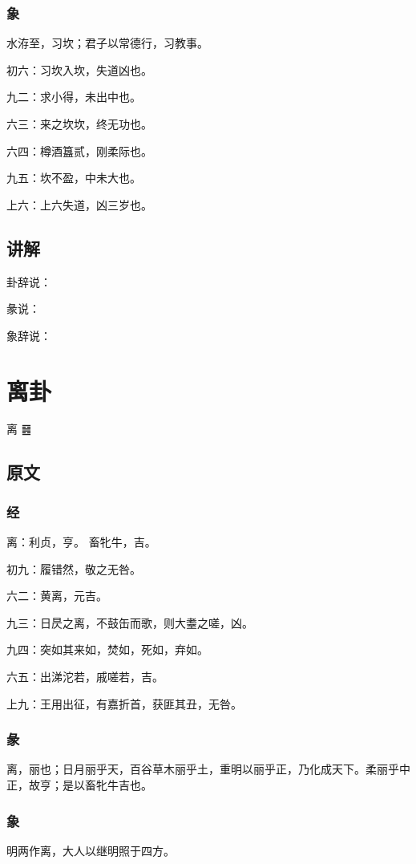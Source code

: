 \documentclass[12pt,oneside]{book}
\begin{document}
\subsection{象}
水洊至，习坎；君子以常德行，习教事。

初六：习坎入坎，失道凶也。

九二：求小得，未出中也。

六三：来之坎坎，终无功也。

六四：樽酒簋贰，刚柔际也。

九五：坎不盈，中未大也。

上六：上六失道，凶三岁也。

\section{讲解}
卦辞说：

彖说：

象辞说：

\chapter{离卦}
离 {\Large ䷝}

\section{原文}


\subsection{经}
离：利贞，亨。 畜牝牛，吉。

初九：履错然，敬之无咎。

六二：黄离，元吉。

九三：日昃之离，不鼓缶而歌，则大耋之嗟，凶。

九四：突如其来如，焚如，死如，弃如。

六五：出涕沱若，戚嗟若，吉。

上九：王用出征，有嘉折首，获匪其丑，无咎。

\subsection{彖}
离，丽也；日月丽乎天，百谷草木丽乎土，重明以丽乎正，乃化成天下。柔丽乎中正，故亨；是以畜牝牛吉也。

\subsection{象}
明两作离，大人以继明照于四方。
\end{document}
